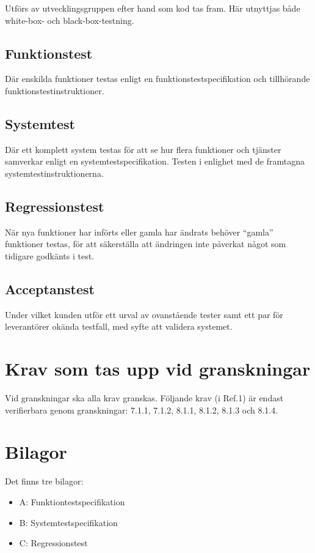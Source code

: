 \documentclass[a4paper]{article}
\begin{document}
Utförs av utvecklingsgruppen efter hand som kod tas fram. Här utnyttjas både white-box- och black-box-testning.

\subsection{Funktionstest}

Där enskilda funktioner testas enligt en funktionstestspecifikation och tillhörande funktionstestinstruktioner. 

\subsection{Systemtest}

Där ett komplett system testas för att se hur flera funktioner och tjänster samverkar enligt en systemtestspecifikation. Testen i enlighet med de framtagna systemtestinstruktionerna. 

\subsection{Regressionstest}

När nya funktioner har införts eller gamla har ändrats behöver ``gamla'' funktioner testas, för att säkerställa att ändringen inte påverkat något som tidigare godkänts i test.

\subsection{Acceptanstest}

Under vilket kunden utför ett urval av ovanstående tester samt ett par för leverantörer okända testfall, med syfte att validera systemet.

\section{Krav som tas upp vid granskningar}

Vid granskningar ska alla krav granskas.
Följande krav (i Ref.1) är endast verifierbara genom granskningar: 7.1.1, 7.1.2, 8.1.1, 8.1.2, 8.1.3 och 8.1.4.

\section{Bilagor}

Det finns tre bilagor:

\begin{itemize}
\item A: Funktiontestspecifikation
\item B: Systemtestspecifikation
\item C: Regressionstest

\end{itemize}
\end{document}
